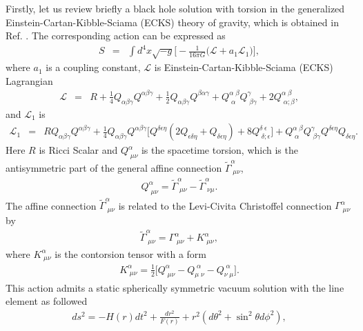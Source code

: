 \documentclass[aps,showpacs,preprintnumbers,amsmath,amssymb]{revtex4}
\begin{document}
Firstly, let us review briefly a black hole solution with torsion in the generalized Einstein-Cartan-Kibble-Sciama (ECKS) theory of gravity, which is obtained in Ref. \cite{sbh1}. The corresponding action can be expressed as
\begin{eqnarray}
S&=&\int d^4x \sqrt{-g}\bigg[-\frac{1}{16\pi G}\bigg(\mathcal{L}+a_1\mathcal{L}_1\bigg)\bigg],
\label{action}
\end{eqnarray}
where $a_1$ is a coupling constant, $\mathcal{L}$ is Einstein-Cartan-Kibble-Sciama (ECKS) Lagrangian \cite{gK1,gK2,sbh1}
\begin{eqnarray}
\mathcal{L}&=& R+\frac{1}{4}Q_{\alpha\beta\gamma}Q^{\alpha\beta\gamma}
+\frac{1}{2}Q_{\alpha\beta\gamma}Q^{\beta\alpha\gamma}+
Q^{\alpha\;\beta}_{\;\alpha}Q^{\gamma}_{\;\beta\gamma}+2Q^{\alpha\;\beta}_{\;\alpha;\beta},
\end{eqnarray}
and $\mathcal{L}_1$ is
\begin{eqnarray}
\mathcal{L}_1&=& RQ_{\alpha\beta\gamma}Q^{\alpha\beta\gamma}
+\frac{1}{4}Q_{\alpha\beta\gamma}Q^{\alpha\beta\gamma}\bigg[Q^{\delta\epsilon\eta}
(2Q_{\epsilon\delta\eta}+Q_{\delta\epsilon\eta})+8Q^{\delta\;\epsilon}_{\;\delta;\epsilon}\bigg]+
Q^{\alpha\;\beta}_{\;\alpha}Q^{\gamma}_{\;\beta\gamma}Q^{\delta\epsilon\eta}Q_{\delta\epsilon\eta}.
\end{eqnarray}
Here $R$ is Ricci Scalar and $Q^{\alpha}_{\;\mu\nu}$ is the spacetime torsion, which is the antisymmetric part of the general affine connection $\tilde{\Gamma}^{\alpha}_{\;\mu\nu}$,
\begin{eqnarray}
Q^{\alpha}_{\;\mu\nu}=\tilde{\Gamma}^{\alpha}_{\;\mu\nu}-\tilde{\Gamma}^{\alpha}_{\;\nu\mu}.
\end{eqnarray}
The affine connection $\tilde{\Gamma}^{\alpha}_{\;\mu\nu}$ is related to the Levi-Civita Christoffel connection $\Gamma^{\alpha}_{\;\mu\nu}$ by
\begin{eqnarray}
\tilde{\Gamma}^{\alpha}_{\;\mu\nu}=\Gamma^{\alpha}_{\;\mu\nu}+K^{\alpha}_{\;\mu\nu},
\end{eqnarray}
where $K^{\alpha}_{\;\mu\nu}$ is the contorsion tensor with a form
\begin{eqnarray}
K^{\alpha}_{\;\mu\nu}=\frac{1}{2}\bigg[Q^{\alpha}_{\;\mu\nu}-Q^{\;\alpha}_{\mu\;\nu}
-Q^{\;\alpha}_{\nu\;\mu}\bigg].
\end{eqnarray}
This action admits  a static spherically symmetric vacuum solution with the line element as followed \cite{sbh1}
\begin{eqnarray}
ds^2 = -H(r) dt^2 + \frac{dr^2}{F(r)} + r^2 (d\theta^2
+\sin^2\theta d\phi^2), \label{metr}
\end{eqnarray}
\end{document}
